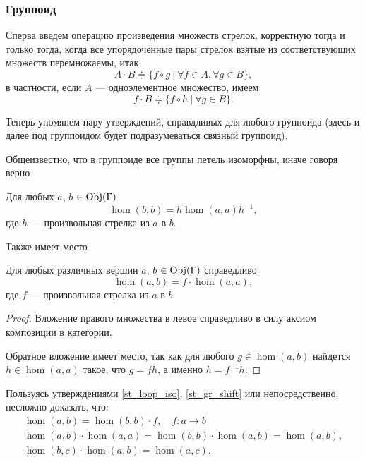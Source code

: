 \subsubsection{Группоид}
    Сперва введем операцию произведения множеств стрелок, корректную тогда и 
    только тогда, когда все упорядоченные пары стрелок взятые из 
    соответствующих множеств перемножаемы, итак
    \begin{equation}\label{cdot_def}
        A \cdot B \doteqdot \{f\circ g \:|\: \forall f \in A, \forall g \in B\},
    \end{equation}
    в частности, если $A$ --- одноэлементное множество, имеем
    \[f \cdot B \doteqdot \{f\circ h \:|\: \forall g \in B\}.\]

    Теперь упомянем пару утверждений, справдливых для любого группоида (здесь и 
    далее под группоидом будет подразумеваться связный группоид).

    \bigskip

    Общеизвестно, что в группоиде все группы петель изоморфны, иначе говоря 
    верно
    \begin{statement}\label{st_loop_iso}
        Для любых $a$, $b$ $\in \operatorname*{Obj}(\Gamma)$
        \begin{equation}
            \hom(b,b) = h\hom(a,a)h^{-1},
        \end{equation}
        где $h$ --- произвольная стрелка из $a$ в $b$.
    \end{statement}

    \bigskip

    Также имеет место
    \begin{statement}\label{st_gr_shift}
        Для любых различных вершин $a$, $b$ $\in \operatorname*{Obj}(\Gamma)$ справедливо
        \begin{equation}\label{eq_fhom}
            \hom(a,b) = f \cdot \hom(a,a),
        \end{equation}
        где $f$ --- произвольная стрелка из $a$ в $b$.
    \end{statement}
    \begin{proof}
        Вложение правого множества в левое справедливо в силу аксиом 
        композиции в категории.
    
        Обратное вложение имеет место, так как для любого $g \in \hom(a,b)$ 
        найдется $h \in \hom(a,a)$ такое, что $g = fh$, а именно $h = f^{-1}h$.
    \end{proof}

    \begin{corollary}
        Пользуясь утверждениями \ref{st_loop_iso}, \ref{st_gr_shift} или 
        непосредственно, несложно доказать, что:
        \begin{gather*}
            \hom(a,b) = \hom(b,b) \cdot f,\quad f:a\to b\\
            \hom(a,b) \cdot \hom(a,a) = \hom(b,b) \cdot \hom(a,b) = \hom(a,b),\\
            \hom(b,c) \cdot \hom(a,b) = \hom(a,c). 
        \end{gather*}
    \end{corollary}

